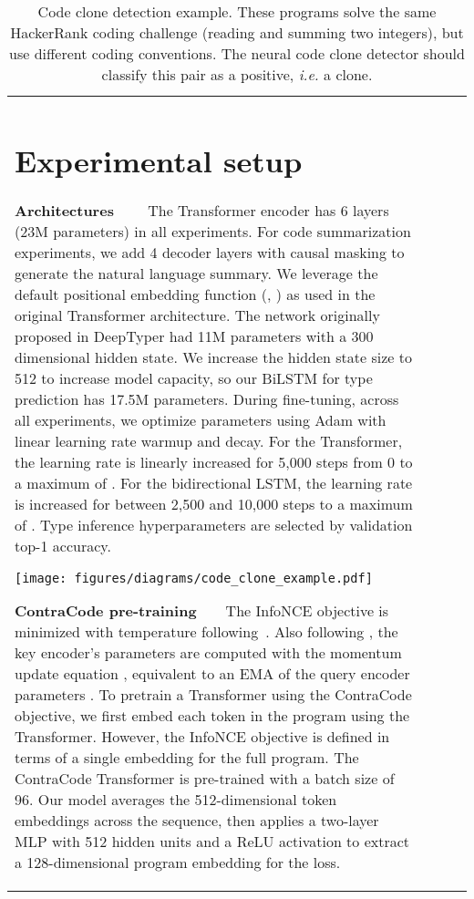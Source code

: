 \documentclass{article}
\newcommand{\ours}[0]{ContraCode}
\begin{document}
\begin{table}[t]
{\begin{tabular}{llcc}
{{\section{Experimental setup}
\textbf{Architectures}~~~~
The Transformer encoder has 6 layers (23M parameters) in all experiments. For code summarization experiments, we add 4 decoder layers with causal masking to generate the natural language summary.
We leverage the default positional embedding function (, ) as used in the original Transformer architecture. The network originally proposed in DeepTyper \citep{hellendoorn2018deep} had 11M parameters with a 300 dimensional hidden state. We increase the hidden state size to 512 to increase model capacity, so our BiLSTM for type prediction has 17.5M parameters.
During fine-tuning, across all experiments, we optimize parameters using Adam with linear learning rate warmup and decay. For the Transformer, the learning rate is linearly increased for 5,000 steps from 0 to a maximum of . For the bidirectional LSTM, the learning rate is increased for between 2,500 and 10,000 steps to a maximum of . Type inference hyperparameters are selected by validation top-1 accuracy.

\begin{figure*}[t]
    \centering
    \texttt{[image: figures/diagrams/code\_clone\_example.pdf]}
    \caption{Code clone detection example. These programs solve the same HackerRank coding challenge (reading and summing two integers), but use different coding conventions. The neural code clone detector should classify this pair as a positive, \textit{i.e.} a clone.}
    \label{fig:code_clone_example}
\end{figure*}

\textbf{\ours{} pre-training}~~~~The InfoNCE objective is minimized with temperature  following~\citet{he2019momentum}. Also following \citet{he2019momentum}, the key encoder's parameters are computed with the momentum update equation , equivalent to an EMA of the query encoder parameters . To pretrain a Transformer using the \ours{} objective, we first embed each token in the program using the Transformer. However, the InfoNCE objective is defined in terms of a single embedding for the full program. The \ours{} Transformer is pre-trained with a batch size of 96. Our model averages the 512-dimensional token embeddings across the sequence, then applies a two-layer MLP with 512 hidden units and a ReLU activation to extract a 128-dimensional program embedding for the loss.

}}
\end{tabular}}
\end{table}
\end{document}

